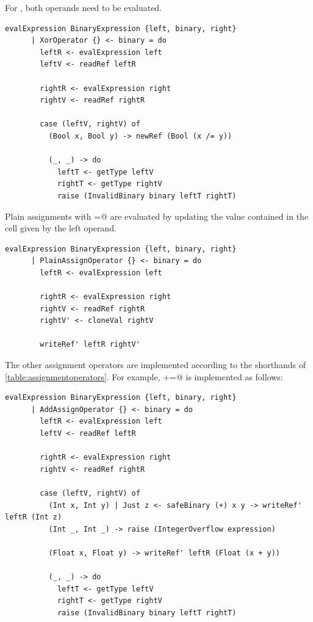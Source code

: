 \documentclass[UdineBachThesis,american,11pt]{PhdThesis}
\begin{document}
  \newpage

  For \lstinline@xor@, both operands need to be evaluated.

  \begin{lstlisting}[gobble=4,basicstyle=\ttfamily\small]
    evalExpression BinaryExpression {left, binary, right}
      | XorOperator {} <- binary = do
        leftR <- evalExpression left
        leftV <- readRef leftR

        rightR <- evalExpression right
        rightV <- readRef rightR

        case (leftV, rightV) of
          (Bool x, Bool y) -> newRef (Bool (x /= y))

          (_, _) -> do
            leftT <- getType leftV
            rightT <- getType rightV
            raise (InvalidBinary binary leftT rightT)
  \end{lstlisting}

  Plain assignments with \lstinline@=@ are evaluated by updating the value
  contained in the cell given by the left operand.

  \begin{lstlisting}[gobble=4,basicstyle=\ttfamily\small]
    evalExpression BinaryExpression {left, binary, right}
      | PlainAssignOperator {} <- binary = do
        leftR <- evalExpression left

        rightR <- evalExpression right
        rightV <- readRef rightR
        rightV' <- cloneVal rightV

        writeRef' leftR rightV'
  \end{lstlisting}

  The other assignment operators are implemented according to the shorthands of
  \autoref{table:assignmentoperators}. For example, \lstinline@+=@ is
  implemented as follows:

  \begin{lstlisting}[gobble=4,basicstyle=\ttfamily\small]
    evalExpression BinaryExpression {left, binary, right}
      | AddAssignOperator {} <- binary = do
        leftR <- evalExpression left
        leftV <- readRef leftR

        rightR <- evalExpression right
        rightV <- readRef rightR

        case (leftV, rightV) of
          (Int x, Int y) | Just z <- safeBinary (+) x y -> writeRef' leftR (Int z)
          (Int _, Int _) -> raise (IntegerOverflow expression)

          (Float x, Float y) -> writeRef' leftR (Float (x + y))

          (_, _) -> do
            leftT <- getType leftV
            rightT <- getType rightV
            raise (InvalidBinary binary leftT rightT)
  \end{lstlisting}
\end{document}
